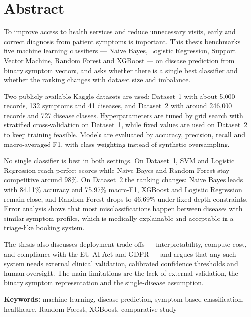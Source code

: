 \chapter*{Abstract}

To improve access to health services and reduce unnecessary visits, early and correct diagnosis from patient symptoms is important. This thesis benchmarks five machine learning classifiers --- Naive Bayes, Logistic Regression, Support Vector Machine, Random Forest and XGBoost --- on disease prediction from binary symptom vectors, and asks whether there is a single best classifier and whether the ranking changes with dataset size and imbalance.

Two publicly available Kaggle datasets are used: Dataset~1 with about 5,000 records, 132 symptoms and 41 diseases, and Dataset~2 with around 246,000 records and 727 disease classes. Hyperparameters are tuned by grid search with stratified cross-validation on Dataset~1, while fixed values are used on Dataset~2 to keep training feasible. Models are evaluated by accuracy, precision, recall and macro-averaged F1, with class weighting instead of synthetic oversampling.

No single classifier is best in both settings. On Dataset~1, SVM and Logistic Regression reach perfect scores while Naive Bayes and Random Forest stay competitive around 98\%. On Dataset~2 the ranking changes: Naive Bayes leads with 84.11\% accuracy and 75.97\% macro-F1, XGBoost and Logistic Regression remain close, and Random Forest drops to 46.69\% under fixed-depth constraints. Error analysis shows that most misclassifications happen between diseases with similar symptom profiles, which is medically explainable and acceptable in a triage-like booking system.

The thesis also discusses deployment trade-offs --- interpretability, compute cost, and compliance with the EU AI Act and GDPR --- and argues that any such system needs external clinical validation, calibrated confidence thresholds and human oversight. The main limitations are the lack of external validation, the binary symptom representation and the single-disease assumption.

\vspace{0.5cm}
\noindent\textbf{Keywords:} machine learning, disease prediction, symptom-based classification, healthcare, Random Forest, XGBoost, comparative study
